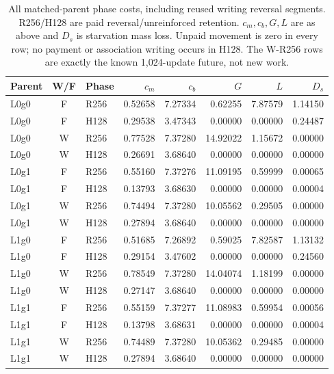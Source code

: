 \begin{table}[htbp]\centering\scriptsize
\caption{All matched-parent phase costs, including reused writing reversal segments. R256/H128 are paid reversal/unreinforced retention. $c_m,c_b,G,L$ are as above and $D_s$ is starvation mass loss. Unpaid movement is zero in every row; no payment or association writing occurs in H128. The W-R256 rows are exactly the known 1,024-update future, not new work.}\label{tab:coordinated-costs}
\setlength{\tabcolsep}{3.5pt}\begin{tabular}{lclrrrrr}\toprule
Parent & W/F & Phase & $c_m$ & $c_b$ & $G$ & $L$ & $D_s$\\\midrule
L0g0 & F & R256 & 0.52658 & 7.27334 & 0.62255 & 7.87579 & 1.14150 \\
L0g0 & F & H128 & 0.29538 & 3.47343 & 0.00000 & 0.00000 & 0.24487 \\
L0g0 & W & R256 & 0.77528 & 7.37280 & 14.92022 & 1.15672 & 0.00000 \\
L0g0 & W & H128 & 0.26691 & 3.68640 & 0.00000 & 0.00000 & 0.00000 \\
L0g1 & F & R256 & 0.55160 & 7.37276 & 11.09195 & 0.59999 & 0.00065 \\
L0g1 & F & H128 & 0.13793 & 3.68630 & 0.00000 & 0.00000 & 0.00004 \\
L0g1 & W & R256 & 0.74494 & 7.37280 & 10.05562 & 0.29505 & 0.00000 \\
L0g1 & W & H128 & 0.27894 & 3.68640 & 0.00000 & 0.00000 & 0.00000 \\
L1g0 & F & R256 & 0.51685 & 7.26892 & 0.59025 & 7.82587 & 1.13132 \\
L1g0 & F & H128 & 0.29154 & 3.47602 & 0.00000 & 0.00000 & 0.24560 \\
L1g0 & W & R256 & 0.78549 & 7.37280 & 14.04074 & 1.18199 & 0.00000 \\
L1g0 & W & H128 & 0.27147 & 3.68640 & 0.00000 & 0.00000 & 0.00000 \\
L1g1 & F & R256 & 0.55159 & 7.37277 & 11.08983 & 0.59954 & 0.00056 \\
L1g1 & F & H128 & 0.13798 & 3.68631 & 0.00000 & 0.00000 & 0.00004 \\
L1g1 & W & R256 & 0.74489 & 7.37280 & 10.05362 & 0.29485 & 0.00000 \\
L1g1 & W & H128 & 0.27894 & 3.68640 & 0.00000 & 0.00000 & 0.00000 \\
\bottomrule\end{tabular}\end{table}\FloatBarrier

